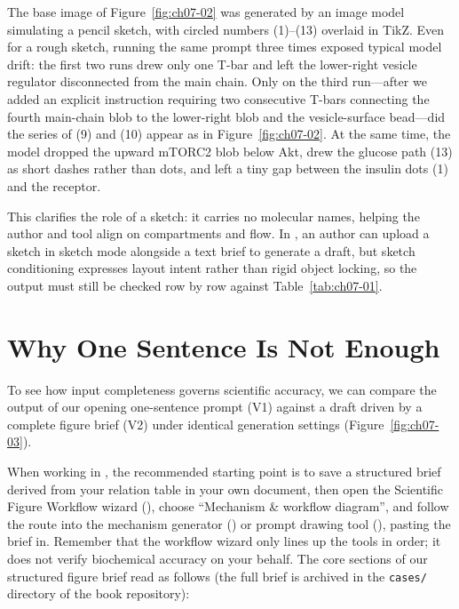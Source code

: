The base image of Figure~\ref{fig:ch07-02} was generated by an image model simulating a pencil sketch, with circled numbers (1)--(13) overlaid in TikZ. Even for a rough sketch, running the same prompt three times exposed typical model drift: the first two runs drew only one T-bar and left the lower-right vesicle regulator disconnected from the main chain. Only on the third run---after we added an explicit instruction requiring two consecutive T-bars connecting the fourth main-chain blob to the lower-right blob and the vesicle-surface bead---did the series of (9) and (10) appear as in Figure~\ref{fig:ch07-02}. At the same time, the model dropped the upward mTORC2 blob below Akt, drew the glucose path (13) as short dashes rather than dots, and left a tiny gap between the insulin dots (1) and the receptor.

This clarifies the role of a sketch: it carries no molecular names, helping the author and tool align on compartments and flow. In \scidraw{}, an author can upload a sketch in sketch mode alongside a text brief to generate a draft, but sketch conditioning expresses layout intent rather than rigid object locking, so the output must still be checked row by row against Table~\ref{tab:ch07-01}.

\section{Why One Sentence Is Not Enough}

To see how input completeness governs scientific accuracy, we can compare the output of our opening one-sentence prompt (V1) against a draft driven by a complete figure brief (V2) under identical generation settings (Figure~\ref{fig:ch07-03}).

When working in \scidraw{}, the recommended starting point is to save a structured brief derived from your relation table in your own document, then open the Scientific Figure Workflow wizard (), choose ``Mechanism \& workflow diagram'', and follow the route into the mechanism generator () or prompt drawing tool (), pasting the brief in. Remember that the workflow wizard only lines up the tools in order; it does not verify biochemical accuracy on your behalf. The core sections of our structured figure brief read as follows (the full brief is archived in the \texttt{cases/} directory of the book repository):


